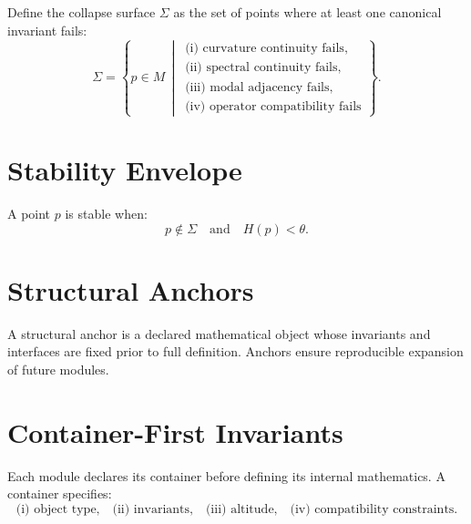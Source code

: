 \documentclass[11pt]{article}
\begin{document}
Define the collapse surface $\Sigma$ as the set of points where at least one
canonical invariant fails:
\[
\Sigma
  = \left\{
      p \in M \,\middle|\,
      \begin{array}{l}
        \text{(i) curvature continuity fails,} \\
        \text{(ii) spectral continuity fails,} \\
        \text{(iii) modal adjacency fails,} \\
        \text{(iv) operator compatibility fails}
      \end{array}
    \right\}.
\]

\section{Stability Envelope}

A point $p$ is stable when:
\[
p \notin \Sigma
\quad\text{and}\quad
H(p) < \theta.
\]

\section{Structural Anchors}

A structural anchor is a declared mathematical object whose invariants and
interfaces are fixed prior to full definition. Anchors ensure reproducible
expansion of future modules.

\section{Container-First Invariants}

Each module declares its container before defining its internal mathematics.
A container specifies:
\[
\text{(i) object type,} \quad
\text{(ii) invariants,} \quad
\text{(iii) altitude,} \quad
\text{(iv) compatibility constraints.}
\]
\end{document}
